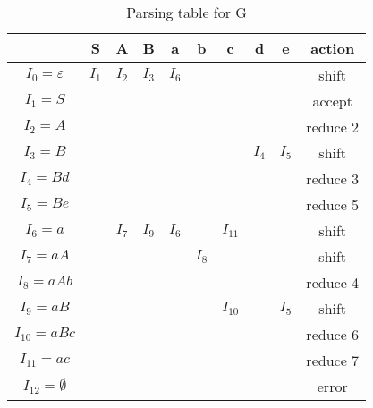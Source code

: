 \begin{table}[H]
    \centering
    \begin{tabular}{|c|c|c|c|c|c|c|c|c|c|}
         \hline  & S & A & B & a & b & c & d & e & action  \\
         \hline $I_0 = \varepsilon$ & $I_1$ & $I_2$ & $I_3$ & $I_6$ &  &  &   &  & shift \\
         \hline $I_1 = S$  &   &  &  &  &  &  &  &  & accept\\
         \hline $I_2 = A$ &   &  &  &  &  &  &  &  & reduce 2  \\
         \hline $I_3 = B$&   &  &  &  &  &  & $I_4$ & $I_5$ & shift \\
         \hline $I_4 = Bd$  &  &  &  &  &  &  &  &  & reduce 3 \\
         \hline $I_5 = Be$  &  &  &  &  &  &  &  &  & reduce 5 \\
         \hline $I_6 = a$ & &  $I_7$ & $I_9$ & $I_6$ &  & $I_{11}$ &  &   & shift \\
         \hline $I_7 = aA$ &  &  &  &  & $I_8$ &  &  &  & shift \\
         \hline $I_8 = aAb$ &    &  &  &  &  &  &  &  & reduce 4 \\
         \hline $I_9 = aB$&  &   &  &  &  & $I_{10}$ &  & $I_5$ & shift\\
         \hline $I_{10} = aBc$&  &  &  &  &  &  &  &  & reduce 6 \\
         \hline $I_{11} = ac$&   &  &  &  &  &  &  &  & reduce 7 \\
         \hline $I_{12} = \emptyset$ &   &  &  &  &  &  &  &  & error \\
         \hline
    \end{tabular}
    \caption{Parsing table for G}
    \label{tab:my_label}
\end{table}